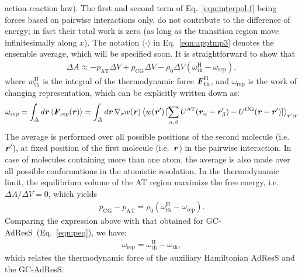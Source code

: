 \documentclass[a4paper,preprint,unsortedaddress]{revtex4-1}
\newcommand{\vect}[1]{\textbf{\textit{#1}}}
\newcommand{\AT}{{\textrm{{AT}}}}
\newcommand{\CG}{{\textrm{CG}}}
\newcommand{\HY}{{\Delta}}
\newcommand{\thf}{{\textrm{th}}}
\newcommand{\res}{{\textrm{rep}}}
\newcommand{\hadress}{{\textrm{H}}}
\begin{document}
{action-reaction law). The first and second term of Eq.~\eqref{eqn:interpol-f}
being forces based on pairwise interactions only, do not contribute to the difference of energy; in fact 
their total work is zero (as long as the transition region move infinitesimally along $x$).
The notation $\langle\cdot\rangle$ in Eq.~\eqref{eqn:apptmp3} denotes the ensemble average, which
will be specified soon.
It is straightforward to show that
\begin{align}\label{eqn:peq-d}
  \Delta A \approx
  -p_\AT\Delta V + p_\CG\Delta V -
  \rho_0 \Delta V (\omega_\thf^\hadress - \omega_\res), 
\end{align}
where $w_\thf^\hadress$ is the integral of the 
thermodynamic force $\vect F_\thf^\hadress$, and
$ \omega_\res$ is the work of changing representation,
which can be explicitly written down as:
\begin{align}\label{eqn:w-rep}
  \omega_\res
  = \int_\HY d \vect r\,\langle \vect F_\res (\vect r)\rangle
  = \int_\HY d \vect r\,\nabla_{\vect r}w(\vect r)\,
  \big\langle w(\vect r')\,
  [\sum_{\alpha,\beta}U^\AT(\vect r_\alpha-\vect r'_\beta) - U^\CG(\vect r-\vect r')]\big\rangle_{\vect r'; \vect r}
\end{align}
The average is performed over all
  possible positions of the second molecule (i.e.~$\vect r'$),
  at fixed position of the first molecule (i.e.~$\vect r$) 
  in the pairwise interaction.
In case of molecules containing
more than one atom, the average is also made over all possible
conformations in the atomistic resolution.
In the thermodynamic limit, the equilibrium volume of the AT region maximize the
free energy, i.e.~$\Delta A / \Delta V
= 0$, which yields
\begin{align}\label{eqn:peq-h}
  p_\CG - p_\AT =  \rho_0 (\omega_\thf^\hadress - \omega_\res).
\end{align}
Comparing the expression above with that obtained for GC-AdResS~(Eq.~\eqref{eqn:peq}),
we have: 
\begin{align}\label{eqn:hd-rel}
  \omega_\res = \omega_\thf^\hadress -   \omega_\thf,
\end{align}
which relates the thermodynamic force of the auxiliary Hamiltonian AdResS
and the GC-AdResS.\\

}
\end{document}
